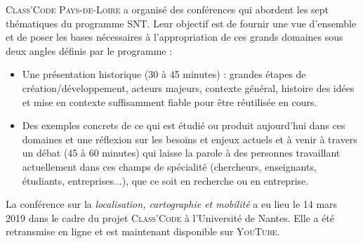 \textsc{Class'Code} \textsc{Pays-de-Loire} a organisé des conférences qui abordent les sept thématiques du programme SNT. Leur objectif est de fournir une vue d’ensemble et de poser les bases nécessaires à l’appropriation de ces grands domaines sous deux angles définis par le programme :
\begin{itemize}
\item Une présentation historique (30 à 45 minutes) : grandes étapes de création/développement, acteurs majeurs, contexte général, histoire des idées et mise en contexte suffisamment fiable pour être réutilisée en cours.
\item Des exemples concrets de ce qui est étudié ou produit aujourd’hui dans ces domaines et une réflexion sur les besoins et enjeux actuels et à venir à travers un débat (45 à 60 minutes) qui laisse la parole à des personnes travaillant actuellement dans ces champs de spécialité  (chercheurs, enseignants, étudiants, entreprises...), que ce soit en recherche ou en entreprise.
\end{itemize}

La conférence sur la \textit{localisation, cartographie et mobilité} a eu lieu le 14 mars 2019 dans le cadre du projet \textsc{Class'Code} à l’Université de Nantes. Elle a été retransmise en ligne et est maintenant disponible sur \textsc{YouTube}.

